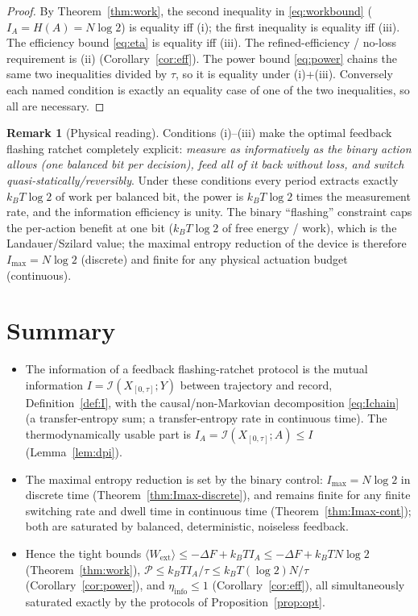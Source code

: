 \documentclass{amsart}
\theoremstyle{definition}
\newtheorem{remark}{Remark}
\newcommand{\kB}{k_{B}}
\newcommand{\Wext}{\langle W_{\mathrm{ext}}\rangle}
\begin{document}
\begin{proof}
By Theorem~\ref{thm:work}, the second inequality in \eqref{eq:workbound}
($I_A=H(A)=N\log2$) is equality iff (i); the first inequality is equality iff
(iii). The efficiency bound \eqref{eq:eta} is equality iff (iii). The
refined-efficiency / no-loss requirement is (ii) (Corollary~\ref{cor:eff}).
The power bound \eqref{eq:power} chains the same two inequalities divided by
$\tau$, so it is equality under (i)+(iii). Conversely each named condition is
exactly an equality case of one of the two inequalities, so all are necessary.
\end{proof}

\begin{remark}[Physical reading]
Conditions (i)--(iii) make the optimal feedback flashing ratchet completely
explicit: \emph{measure as informatively as the binary action allows (one
balanced bit per decision), feed all of it back without loss, and switch
quasi-statically/reversibly}. Under these conditions every period extracts
exactly $\kB T\log2$ of work per balanced bit, the power is $\kB T\log2$ times
the measurement rate, and the information efficiency is unity. The binary
``flashing'' constraint caps the per-action benefit at one bit
($\kB T\log2$ of free energy / work), which is the Landauer/Szilard value;
the maximal entropy reduction of the device is therefore $I_{\max}=N\log2$
(discrete) and finite for any physical actuation budget (continuous).
\end{remark}

\section*{Summary}
\begin{itemize}
\item[(a)] The information of a feedback flashing-ratchet protocol is the
mutual information $I=\mathcal I(X_{[0,\tau]};Y)$ between trajectory and
record, Definition~\ref{def:I}, with the causal/non-Markovian decomposition
\eqref{eq:Ichain} (a transfer-entropy sum; a transfer-entropy rate in
continuous time). The thermodynamically usable part is
$I_A=\mathcal I(X_{[0,\tau]};A)\le I$ (Lemma~\ref{lem:dpi}).
\item[(b)] The maximal entropy reduction is set by the binary control:
$I_{\max}=N\log2$ in discrete time (Theorem~\ref{thm:Imax-discrete}), and
remains finite for any finite switching rate and dwell time in continuous time
(Theorem~\ref{thm:Imax-cont}); both are saturated by balanced, deterministic,
noiseless feedback.
\item[(c)] Hence the tight bounds
$\Wext\le -\Delta F+\kB T I_A\le -\Delta F+\kB T N\log2$
(Theorem~\ref{thm:work}),
$\mathcal P\le \kB T I_A/\tau\le \kB T(\log2)N/\tau$
(Corollary~\ref{cor:power}), and $\eta_{\mathrm{info}}\le1$
(Corollary~\ref{cor:eff}), all simultaneously saturated exactly by the
protocols of Proposition~\ref{prop:opt}.
\end{itemize}
\end{document}
